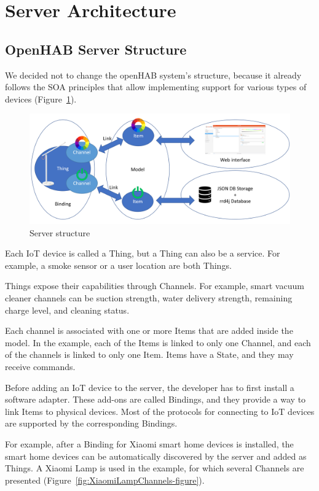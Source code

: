 \section{Server Architecture}
\subsection{OpenHAB Server Structure}

We decided not to change the openHAB system's structure, because it already follows the SOA principles that allow implementing support for various types of devices (Figure~\ref{fig:openHABServerStructure-figure}).

\begin{figure}
  \centering
  \includegraphics[width=0.9\linewidth]{figures/openHABServerStructure.png}
  \caption{Server structure}
  \label{fig:openHABServerStructure-figure}
\end{figure}

Each IoT device is called a Thing, but a Thing can also be a service. For example, a smoke sensor or a user location are both Things.

Things expose their capabilities through Channels. For example, smart vacuum cleaner channels can be suction strength, water delivery strength, remaining charge level, and cleaning status.

Each channel is associated with one or more Items that are added inside the model. In the example, each of the Items is linked to only one Channel, and each of the channels is linked to only one Item. Items have a State, and they may receive commands. 

Before adding an IoT device to the server, the developer has to first install a software adapter. These add-ons are called Bindings, and they provide a way to link Items to physical devices. Most of the protocols for connecting to IoT devices are supported by the corresponding Bindings.

For example, after a Binding for Xiaomi smart home devices is installed, the smart home devices can be automatically discovered by the server and added as Things. A Xiaomi Lamp is used in the example, for which several Channels are presented (Figure~\ref{fig:XiaomiLampChannels-figure}).

